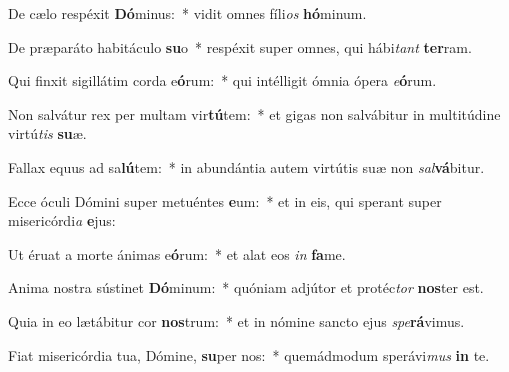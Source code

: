 \item De cælo respéxit \textbf{Dó}minus:~* vidit omnes fíli\textit{os} \textbf{hó}minum.
\item De præparáto habitáculo \textbf{su}o~* respéxit super omnes, qui hábi\textit{tant} \textbf{ter}ram.
\item Qui finxit sigillátim corda e\textbf{ó}rum:~* qui intélligit ómnia ópera \textit{e}\textbf{ó}rum.
\item Non salvátur rex per multam vir\textbf{tú}tem:~* et gigas non salvábitur in multitúdine virtú\textit{tis} \textbf{su}æ.
\item Fallax equus ad sa\textbf{lú}tem:~* in abundántia autem virtútis suæ non \textit{sal}\textbf{vá}bitur.
\item Ecce óculi Dómini super metuéntes \textbf{e}um:~* et in eis, qui sperant super misericórdi\textit{a} \textbf{e}jus:
\item Ut éruat a morte ánimas e\textbf{ó}rum:~* et alat eos \textit{in} \textbf{fa}me.
\item Anima nostra sústinet \textbf{Dó}minum:~* quóniam adjútor et protéc\textit{tor} \textbf{nos}ter est.
\item Quia in eo lætábitur cor \textbf{nos}trum:~* et in nómine sancto ejus \textit{spe}\textbf{rá}vimus.
\item Fiat misericórdia tua, Dómine, \textbf{su}per nos:~* quemádmodum sperávi\textit{mus} \textbf{in} te.
